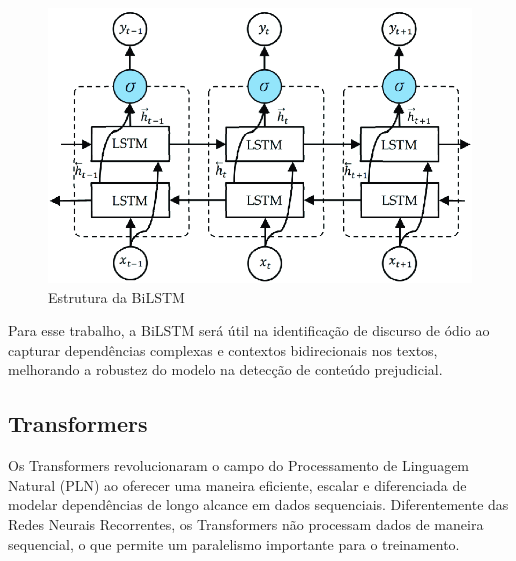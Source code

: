 \documentclass[conference]{IEEEtran}
\begin{document}
\begin{figure}[h!]
    \centering
    \includegraphics[width=\linewidth]{bilstm.png}
    \caption{Estrutura da BiLSTM}
    \label{fig:exemplo2}
\end{figure}

\indent Para esse trabalho, a BiLSTM será útil na identificação de discurso de ódio ao capturar dependências complexas e contextos bidirecionais nos textos, melhorando a robustez do modelo na detecção de conteúdo prejudicial.

\subsection{Transformers}

Os Transformers revolucionaram o campo do Processamento de Linguagem Natural (PLN) ao oferecer uma maneira eficiente, escalar e diferenciada de modelar dependências de longo alcance em dados sequenciais. Diferentemente das Redes Neurais Recorrentes, os Transformers não processam dados de maneira sequencial, o que permite um paralelismo \cite{mama} importante para o treinamento.
\end{document}

